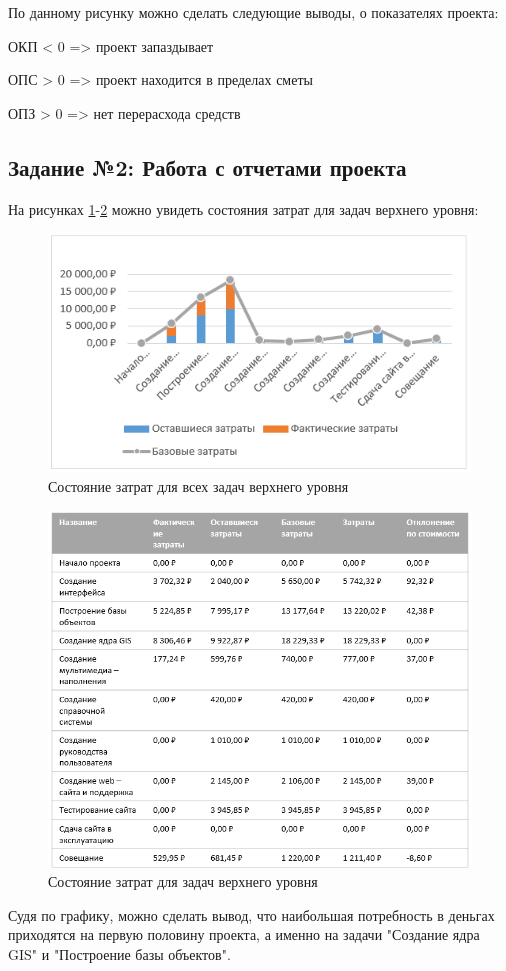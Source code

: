 По данному рисунку можно сделать следующие выводы, о показателях проекта:

\noindent ОКП < 0 => проект запаздывает

\noindent ОПС > 0 => проект находится в пределах сметы

\noindent ОПЗ > 0 => нет перерасхода средств

\newpage
\subsection*{Задание №2: Работа с отчетами проекта}

На рисунках \ref{p4}-\ref{p5} можно увидеть состояния затрат для задач верхнего уровня:
\begin{figure}[!h]
	\centering
	\includegraphics[width=0.7\linewidth]{inc/img/4.png}
	\caption{Состояние затрат для всех задач верхнего уровня}
	\label{p4}
\end{figure}

\begin{figure}[!h]
	\centering
	\includegraphics[width=0.7\linewidth]{inc/img/5.png}
	\caption{Состояние затрат для задач верхнего уровня}
	\label{p5}
\end{figure}

Судя по графику, можно сделать вывод, что наибольшая потребность в деньгах приходятся на первую половину проекта, а именно на задачи "Создание ядра GIS" и "Построение базы объектов".

